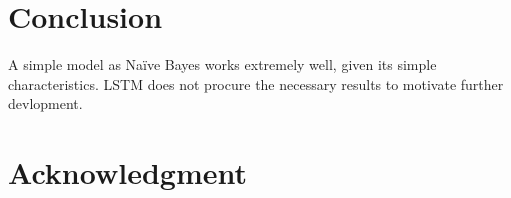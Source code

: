 \documentclass[conference]{IEEEtran}
\begin{document}
%






\section{Conclusion}
A simple model as Naïve Bayes works extremely well, given its simple characteristics. LSTM does not procure the necessary results to motivate further devlopment.






\section*{Acknowledgment}
\end{document}
